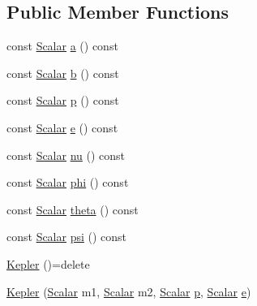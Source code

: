 \subsection*{Public Member Functions}
\begin{DoxyCompactItemize}
\item 
const \mbox{\hyperlink{struct_space_h_1_1_kepler_a19291f268209f594a96fb4828fa1a54c}{Scalar}} \mbox{\hyperlink{struct_space_h_1_1_kepler_abf2934980df9d27a9705b891152e4f22}{a}} () const
\item 
const \mbox{\hyperlink{struct_space_h_1_1_kepler_a19291f268209f594a96fb4828fa1a54c}{Scalar}} \mbox{\hyperlink{struct_space_h_1_1_kepler_ab4c26acf95e92f8e0310bfd965b77562}{b}} () const
\item 
const \mbox{\hyperlink{struct_space_h_1_1_kepler_a19291f268209f594a96fb4828fa1a54c}{Scalar}} \mbox{\hyperlink{struct_space_h_1_1_kepler_a7355f57b679ccf074aecb26c2eaad7f5}{p}} () const
\item 
const \mbox{\hyperlink{struct_space_h_1_1_kepler_a19291f268209f594a96fb4828fa1a54c}{Scalar}} \mbox{\hyperlink{struct_space_h_1_1_kepler_a17a4205719ad64fe7a3b05f86cab7486}{e}} () const
\item 
const \mbox{\hyperlink{struct_space_h_1_1_kepler_a19291f268209f594a96fb4828fa1a54c}{Scalar}} \mbox{\hyperlink{struct_space_h_1_1_kepler_ac0853e59c86fc53e46f13dcfaa03930a}{nu}} () const
\item 
const \mbox{\hyperlink{struct_space_h_1_1_kepler_a19291f268209f594a96fb4828fa1a54c}{Scalar}} \mbox{\hyperlink{struct_space_h_1_1_kepler_a9c646058e884c4e759039e504c4616c2}{phi}} () const
\item 
const \mbox{\hyperlink{struct_space_h_1_1_kepler_a19291f268209f594a96fb4828fa1a54c}{Scalar}} \mbox{\hyperlink{struct_space_h_1_1_kepler_a54cb1ca091a25449bd298c3dfdd21f6b}{theta}} () const
\item 
const \mbox{\hyperlink{struct_space_h_1_1_kepler_a19291f268209f594a96fb4828fa1a54c}{Scalar}} \mbox{\hyperlink{struct_space_h_1_1_kepler_a053b7309d6296ff35c16a0fd4450e3d5}{psi}} () const
\item 
\mbox{\hyperlink{struct_space_h_1_1_kepler_a3763d2c0a28c244c5a9b992f95ebdd9d}{Kepler}} ()=delete
\item 
\mbox{\hyperlink{struct_space_h_1_1_kepler_a99435c19c0e7c815f067666e374a13e4}{Kepler}} (\mbox{\hyperlink{struct_space_h_1_1_kepler_a19291f268209f594a96fb4828fa1a54c}{Scalar}} m1, \mbox{\hyperlink{struct_space_h_1_1_kepler_a19291f268209f594a96fb4828fa1a54c}{Scalar}} m2, \mbox{\hyperlink{struct_space_h_1_1_kepler_a19291f268209f594a96fb4828fa1a54c}{Scalar}} \mbox{\hyperlink{struct_space_h_1_1_kepler_a7355f57b679ccf074aecb26c2eaad7f5}{p}}, \mbox{\hyperlink{struct_space_h_1_1_kepler_a19291f268209f594a96fb4828fa1a54c}{Scalar}} \mbox{\hyperlink{struct_space_h_1_1_kepler_a17a4205719ad64fe7a3b05f86cab7486}{e}})

\end{DoxyCompactItemize}
